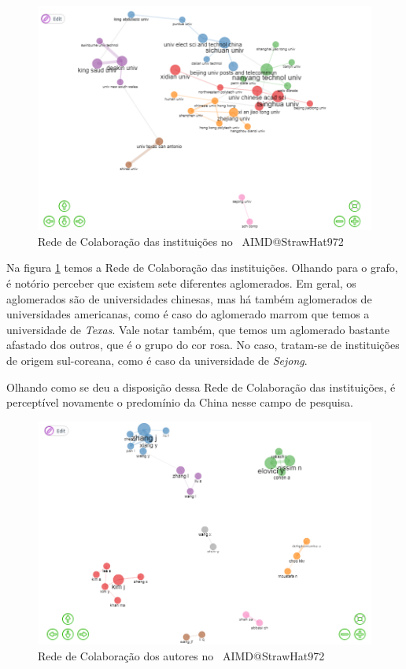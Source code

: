 \begin{figure}[H]
    \centering
    \includegraphics[width=1\textwidth]{experiments/StrawHat972/PesqBibliogr/IA-DeteccaoMalware/WoS-20220209/Imagens/AIMDCollaborationNetworkIntitutions.png}
    \caption{Rede de Colaboração das instituições no \dataset\ AIMD@StrawHat972}
    \label{fig:StrawHat972:CollabNetI}
\end{figure}

Na figura \ref{fig:StrawHat972:CollabNetI} temos a Rede de Colaboração das instituições. Olhando para o grafo, é notório perceber que existem sete diferentes aglomerados. Em geral, os aglomerados são de universidades chinesas, mas há também aglomerados de universidades americanas, como é caso do aglomerado marrom que temos a universidade de \textit{Texas}. Vale notar também, que temos um aglomerado bastante afastado dos outros, que é o grupo do cor rosa. No caso, tratam-se de instituições de origem sul-coreana, como é caso da universidade de \textit{Sejong}.

Olhando como se deu a disposição dessa Rede de Colaboração das instituições, é perceptível novamente o predomínio da China nesse campo de pesquisa.

\begin{figure}[H]
    \centering
    \includegraphics[width=1\textwidth]{experiments/StrawHat972/PesqBibliogr/IA-DeteccaoMalware/WoS-20220209/Imagens/AIMDCollaborationNetworkAuthors.png}
    \caption{Rede de Colaboração dos autores no \dataset\ AIMD@StrawHat972}
    \label{fig:StrawHat972:CollabNetA}
\end{figure}

